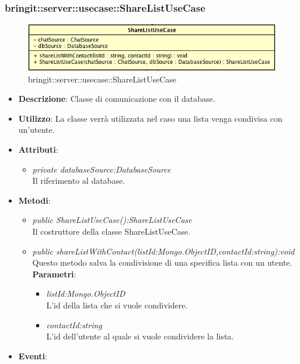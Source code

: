 \subsubsection{bringit::server::usecase::ShareListUseCase}

\label{bringit::server::usecase::ShareListUseCase}
\begin{figure}[H]
	\centering
	\includegraphics[scale=0.5]{Sezioni/SottosezioniST/img/app/ShareListUseCase.png}
	\caption{bringit::server::usecase::ShareListUseCase}
\end{figure}

\begin{itemize}
\item \textbf{Descrizione}: Classe di comunicazione con il database.
\item \textbf{Utilizzo}: La classe verrà utilizzata nel caso una lista venga condivisa con un'utente.
\item \textbf{Attributi}: 
	\begin{itemize}
	\item \textit{private databaseSource:DatabaseSource}\\
	Il riferimento al database.
	\end{itemize}
\item \textbf{Metodi}:
	\begin{itemize}
	\item \textit{public ShareListUseCase():ShareListUseCase}\\
	Il costruttore della classe ShareListUseCase.
	\item \textit{public shareListWithContact(listId:Mongo.ObjectID,contactId:string):void}\\
	Questo metodo salva la condivisione di una specifica lista con un utente.
				\\ \textbf{Parametri}: \begin{itemize}
			\item \textit{listId:Mongo.ObjectID}\\
			L'id della lista che si vuole condividere.
			\item \textit{contactId:string}\\
			L'id dell'utente al quale si vuole condividere la lista.
					\end{itemize} 
	\end{itemize}
\item \textbf{Eventi}:
\end{itemize}

